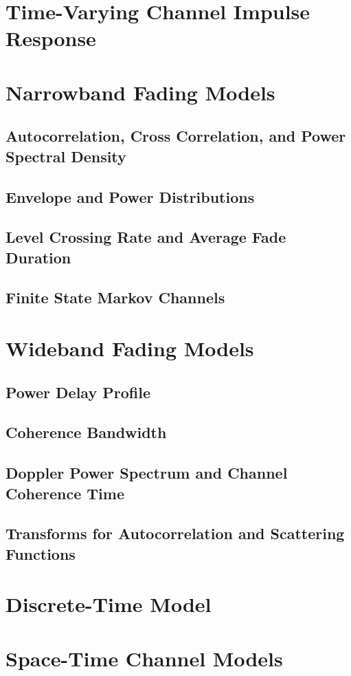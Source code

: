 \documentclass[a4paper,12pt]{book}
\begin{document}
	\section{Time-Varying Channel Impulse Response}
	
	\section{Narrowband Fading Models}
	\subsection{Autocorrelation, Cross Correlation, and Power Spectral Density}
	\subsection{Envelope and Power Distributions}
	\subsection{Level Crossing Rate and Average Fade Duration}
	\subsection{Finite State Markov Channels}
	\section{Wideband Fading Models}
	\subsection{Power Delay Profile}
	\subsection{Coherence Bandwidth}
	\subsection{Doppler Power Spectrum and Channel Coherence Time}
	\subsection{Transforms for Autocorrelation and Scattering Functions}
	\section{Discrete-Time Model}
	\section{Space-Time Channel Models}
	
\end{document}
